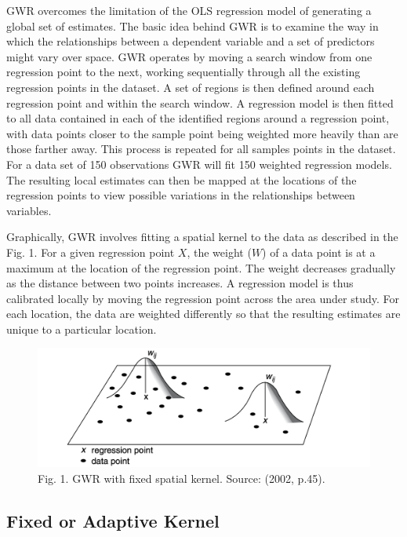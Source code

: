 \documentclass[]{book}
\begin{document}
GWR overcomes the limitation of the OLS regression model of generating a
global set of estimates. The basic idea behind GWR is to examine the way
in which the relationships between a dependent variable and a set of
predictors might vary over space. GWR operates by moving a search window
from one regression point to the next, working sequentially through all
the existing regression points in the dataset. A set of regions is then
defined around each regression point and within the search window. A
regression model is then fitted to all data contained in each of the
identified regions around a regression point, with data points closer to
the sample point being weighted more heavily than are those farther
away. This process is repeated for all samples points in the dataset.
For a data set of 150 observations GWR will fit 150 weighted regression
models. The resulting local estimates can then be mapped at the
locations of the regression points to view possible variations in the
relationships between variables.

Graphically, GWR involves fitting a spatial kernel to the data as
described in the Fig. 1. For a given regression point \(X\), the weight
(\(W\)) of a data point is at a maximum at the location of the
regression point. The weight decreases gradually as the distance between
two points increases. A regression model is thus calibrated locally by
moving the regression point across the area under study. For each
location, the data are weighted differently so that the resulting
estimates are unique to a particular location.

\begin{figure}
\centering
\includegraphics{figs/ch8/fixed_bandwidth.png}
\caption{Fig. 1. GWR with fixed spatial kernel. Source:
\citet{Fotheringham_et_al_2002_book} (2002, p.45).}
\end{figure}

\subsection{Fixed or Adaptive Kernel}\label{fixed-or-adaptive-kernel}
\end{document}
